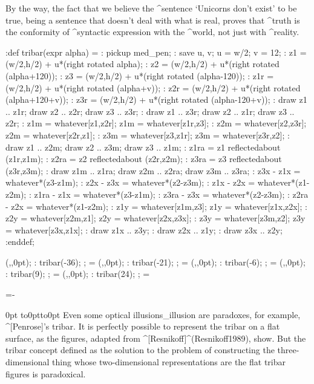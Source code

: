 By the way, the fact that we believe the ^{sentence} `Unicorns don't
exist' to be true, being a sentence that doesn't deal with what is real,
proves that ^{truth} is the conformity of ^{syntactic expression} with
the ^{world}, not just with ^{reality}.


 \MT:def tribar(expr alpha) =
 \MT: pickup med_pen;
 \MT: save u, v; u = w/2; v = 12;
 \MT: z1 = (w/2,h/2) + u*(right rotated alpha);
 \MT: z2 = (w/2,h/2) + u*(right rotated (alpha+120));
 \MT: z3 = (w/2,h/2) + u*(right rotated (alpha-120));
 \MT: z1r = (w/2,h/2) + u*(right rotated (alpha+v));
 \MT: z2r = (w/2,h/2) + u*(right rotated (alpha+120+v));
 \MT: z3r = (w/2,h/2) + u*(right rotated (alpha-120+v));
 \MT: draw z1 .. z1r; draw z2 .. z2r; draw z3 .. z3r;
 \MT: draw z1 .. z3r; draw z2 .. z1r; draw z3 .. z2r;
 \MT: z1m = whatever[z1,z2r]; z1m = whatever[z1r,z3];
 \MT: z2m = whatever[z2,z3r]; z2m = whatever[z2r,z1];
 \MT: z3m = whatever[z3,z1r]; z3m = whatever[z3r,z2];
 \MT: draw z1 .. z2m; draw z2 .. z3m; draw z3 .. z1m;
 \MT: z1ra = z1 reflectedabout (z1r,z1m);
 \MT: z2ra = z2 reflectedabout (z2r,z2m);
 \MT: z3ra = z3 reflectedabout (z3r,z3m);
 \MT: draw z1m .. z1ra; draw z2m .. z2ra; draw z3m .. z3ra;
 \MT: z3x - z1x = whatever*(z3-z1m);
 \MT: z2x - z3x = whatever*(z2-z3m);
 \MT: z1x - z2x = whatever*(z1-z2m);
 \MT: z1ra - z1x = whatever*(z3-z1m);
 \MT: z3ra - z3x = whatever*(z2-z3m);
 \MT: z2ra - z2x = whatever*(z1-z2m);
 \MT: z1y = whatever[z1m,z3]; z1y = whatever[z1x,z2x];
 \MT: z2y = whatever[z2m,z1]; z2y = whatever[z2x,z3x];
 \MT: z3y = whatever[z3m,z2]; z3y = whatever[z3x,z1x];
 \MT: draw z1x .. z3y;
 \MT: draw z2x .. z1y;
 \MT: draw z3x .. z2y;
 \MT:enddef;

 \newdimen\tribar \tribar=75pt

 \MTbeginchar(\the\tribar,\the\tribar,0pt);
 \MT: tribar(-36);
 \MTendchar; =\box\MTbox
 \MTbeginchar(\the\tribar,\the\tribar,0pt);
 \MT: tribar(-21);
 \MTendchar; =\box\MTbox
 \MTbeginchar(\the\tribar,\the\tribar,0pt);
 \MT: tribar(-6);
 \MTendchar; =\box\MTbox
 \MTbeginchar(\the\tribar,\the\tribar,0pt);
 \MT: tribar(9);
 \MTendchar; =\box\MTbox
 \MTbeginchar(\the\tribar,\the\tribar,0pt);
 \MT: tribar(24);
 \MTendchar; =\box\MTbox

 =\hsize \advance{}-\tribar

\noindent{} 0pt 
  \hbox to0pt{\kern{}\vbox to0pt{%
  \kern-10pt\kern-9pt\kern-9pt\kern-12pt\vss}\hss}%
\indent
Even some optical illusions_{illusion} are paradoxes, for example,
^[Penrose]'s tribar. It is perfectly possible to represent the tribar on
a flat surface, as the figures, adapted from
^[Resnikoff]^(Resnikoff1989), show. But the tribar concept defined as
the solution to the problem of constructing the three-\allowhyphens
dimensional thing whose two-\allowhyphens dimensional representations
are the flat tribar figures is paradoxical.

